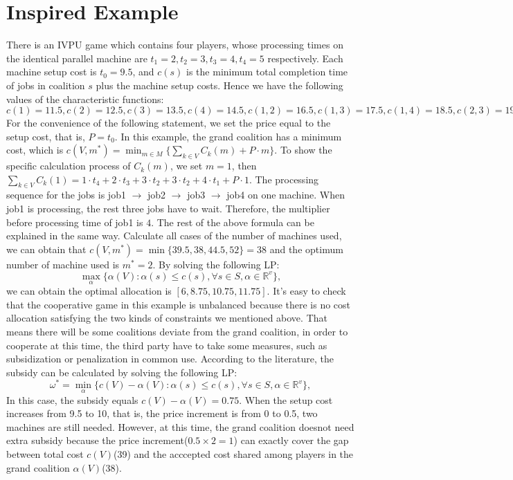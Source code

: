 \section*{Inspired Example}
There is an IVPU game which contains four players, whose processing times on the identical parallel machine are $t_1=2, t_2=3, t_3=4, t_4=5$ respectively. Each machine setup cost is $t_0=9.5$, and $c(s)$ is the minimum total completion time of jobs in coalition $s$ plus the machine setup costs.
Hence we have the following values of the characteristic functions:
$c({1}) = 11.5, c({2}) = 12.5, c({3}) = 13.5, c({4}) = 14.5, c({1,2}) = 16.5, c({1,3}) = 17.5, c({1,4}) = 18.5, c({2,3}) = 19.5, c({2,4}) = 20.5, c({3,4}) = 22.5, c({1,2,3}) = 25.5, c({1,2,4}) = 26.5, c({1,3,4}) = 28.5, c({2,3,4}) = 31.5, c({1,2,3,4}) = 38.$
For the convenience of the following statement, we set the price equal to the setup cost, that is, $P = t_0$.
In this example, the grand coalition has a minimum cost, which is $c(V,m^*) = \min_{m \in M} \{\sum_{k\in V}{C_k(m)}+ P\cdot m\}.$ To show the specific calculation process of $C_k(m)$, we set $m=1$, then $\sum_{k\in V}{C_k(1)} = 1 \cdot t_4 + 2\cdot t_3 + 3 \cdot t_2 + 3 \cdot t_2 + 4 \cdot t_1 + P \cdot 1.$
The processing sequence for the jobs is job1 $\to$ job2 $\to$ job3 $\to$ job4 on one machine. When job1 is processing, the rest three jobs have to wait. Therefore, the multiplier before processing time of job1 is $4$. The rest of the above formula can be explained in the same way.
Calculate all cases of the number of machines used, we can obtain that
$c(V,m^*) = \min\{39.5, 38, 44.5, 52\} = 38$ and the optimum number of machine used is $m^* = 2$.
By solving the following LP:
\[
  \mathop{\max}_{\alpha}\{\alpha(V): \alpha(s)\leq c(s),\forall s \in S, \alpha\in\mathbb{R}^{v}\},
\]
we can obtain the optimal allocation is $[6, 8.75, 10.75, 11.75]$.
It's easy to check that the cooperative game in this example is unbalanced because there is no cost allocation satisfying the two kinds of constraints we mentioned above. That means there will be some coalitions deviate from the grand coalition, in order to cooperate at this time, the third party have to take some measures, such as subsidization or penalization in common use.
According to the literature, the subsidy can be calculated by solving the following LP:
\[
  {\omega^*}=\mathop{\min}_{\alpha}\{c(V)-\alpha(V): \alpha(s)\leq c(s)
 ,\forall s \in S, \alpha\in\mathbb{R}^{v}\},
\]
In this case, the subsidy equals $c(V) - \alpha(V) = 0.75$.
When the setup cost increases from 9.5 to 10, that is, the price increment is from 0 to 0.5, two machines are still needed. However, at this time, the grand coalition doesnot need extra subsidy because the price increment($0.5\times 2 =1$) can exactly cover the gap between total cost $c(V)$(39) and the acccepted cost shared among players in the grand coalition $\alpha(V)$(38).

